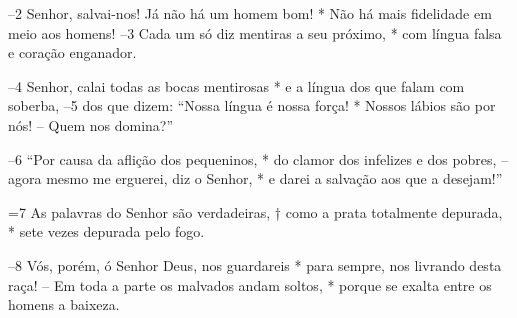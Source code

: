 –2 Senhor, salvai-nos! Já não há um homem bom! *
Não há mais fidelidade em meio aos homens! 
–3 Cada um só diz mentiras a seu próximo, *
com língua falsa e coração enganador.

–4 Senhor, calai todas as bocas mentirosas *
e a língua dos que falam com soberba, 
–5 dos que dizem: “Nossa língua é nossa força! *
Nossos lábios são por nós! – Quem nos domina?”

–6 “Por causa da aflição dos pequeninos, *
do clamor dos infelizes e dos pobres, 
– agora mesmo me erguerei, diz o Senhor, *
e darei a salvação aos que a desejam!”

=7 As palavras do Senhor são verdadeiras, †
como a prata totalmente depurada, *
sete vezes depurada pelo fogo.

–8 Vós, porém, ó Senhor Deus, nos guardareis *
para sempre, nos livrando desta raça! 
– Em toda a parte os malvados andam soltos, *
porque se exalta entre os homens a baixeza.